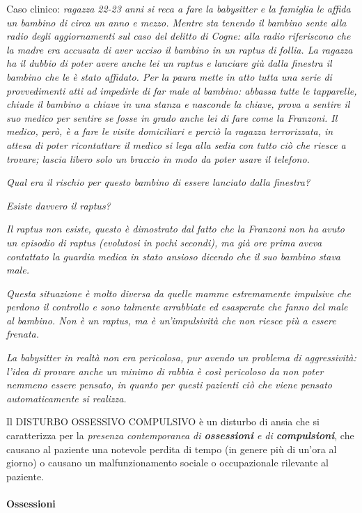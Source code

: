 Caso clinico: \emph{ragazza 22-23 anni si reca a fare la babysitter e la
famiglia le affida un bambino di circa un anno e mezzo. Mentre sta
tenendo il bambino sente alla radio degli aggiornamenti sul caso del
delitto di Cogne: alla radio riferiscono che la madre era accusata di
aver ucciso il bambino in un raptus di follia. La ragazza ha il dubbio
di poter avere anche lei un raptus e lanciare giù dalla finestra il
bambino che le è stato affidato. Per la paura mette in atto tutta una
serie di provvedimenti atti ad impedirle di far male al bambino: abbassa
tutte le tapparelle, chiude il bambino a chiave in una stanza e nasconde
la chiave, prova a sentire il suo medico per sentire se fosse in grado
anche lei di fare come la Franzoni. Il medico, però, è a fare le visite
domiciliari e perciò la ragazza terrorizzata, in attesa di poter
ricontattare il medico si lega alla sedia con tutto ciò che riesce a
trovare; lascia libero solo un braccio in modo da poter usare il
telefono.}

\emph{Qual era il rischio per questo bambino di essere lanciato dalla
finestra?}

\emph{Esiste davvero il raptus?}

\emph{Il raptus non esiste, questo è dimostrato dal fatto che la
Franzoni non ha avuto un episodio di raptus (evolutosi in pochi
secondi), ma già ore prima aveva contattato la guardia medica in stato
ansioso dicendo che il suo bambino stava male.}

\emph{Questa situazione è molto diversa da quelle mamme estremamente
impulsive che perdono il controllo e sono talmente arrabbiate ed
esasperate che fanno del male al bambino. Non è un raptus, ma è
un'impulsività che non riesce più a essere frenata.}

\emph{La babysitter in realtà non era pericolosa, pur avendo un problema
di aggressività: l'idea di provare anche un minimo di rabbia è così
pericoloso da non poter nemmeno essere pensato, in quanto per questi
pazienti ciò che viene pensato automaticamente si realizza.}

Il DISTURBO OSSESSIVO COMPULSIVO è un disturbo di ansia che si
caratterizza per la \emph{presenza contemporanea di \textbf{ossessioni}
e di \textbf{compulsioni}}, che causano al paziente una notevole perdita
di tempo (in genere più di un'ora al giorno) o causano un
malfunzionamento sociale o occupazionale rilevante al paziente.

\paragraph{Ossessioni}

